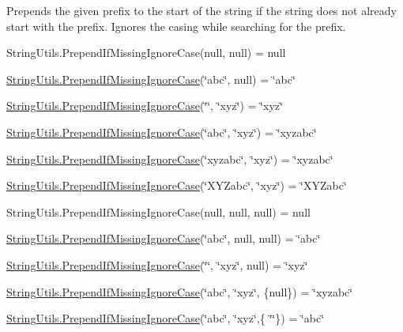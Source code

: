 Prepends the given prefix to the start of the string if the string does not already start with the prefix. Ignores the casing while searching for the prefix. 

String\+Utils.\+Prepend\+If\+Missing\+Ignore\+Case(null, null) = null 

\hyperlink{class_ultimate_1_1_utilities_1_1_string_utils_ab05cdd9dab72f58f40c8930b4f23d3de}{String\+Utils.\+Prepend\+If\+Missing\+Ignore\+Case}(\char`\"{}abc\char`\"{}, null) = \char`\"{}abc\char`\"{} 

\hyperlink{class_ultimate_1_1_utilities_1_1_string_utils_ab05cdd9dab72f58f40c8930b4f23d3de}{String\+Utils.\+Prepend\+If\+Missing\+Ignore\+Case}(\char`\"{}\char`\"{}, \char`\"{}xyz\char`\"{}) = \char`\"{}xyz\char`\"{} 

\hyperlink{class_ultimate_1_1_utilities_1_1_string_utils_ab05cdd9dab72f58f40c8930b4f23d3de}{String\+Utils.\+Prepend\+If\+Missing\+Ignore\+Case}(\char`\"{}abc\char`\"{}, \char`\"{}xyz\char`\"{}) = \char`\"{}xyzabc\char`\"{} 

\hyperlink{class_ultimate_1_1_utilities_1_1_string_utils_ab05cdd9dab72f58f40c8930b4f23d3de}{String\+Utils.\+Prepend\+If\+Missing\+Ignore\+Case}(\char`\"{}xyzabc\char`\"{}, \char`\"{}xyz\char`\"{}) = \char`\"{}xyzabc\char`\"{} 

\hyperlink{class_ultimate_1_1_utilities_1_1_string_utils_ab05cdd9dab72f58f40c8930b4f23d3de}{String\+Utils.\+Prepend\+If\+Missing\+Ignore\+Case}(\char`\"{}\+X\+Y\+Zabc\char`\"{}, \char`\"{}xyz\char`\"{}) = \char`\"{}\+X\+Y\+Zabc\char`\"{} 

String\+Utils.\+Prepend\+If\+Missing\+Ignore\+Case(null, null, null) = null 

\hyperlink{class_ultimate_1_1_utilities_1_1_string_utils_ab05cdd9dab72f58f40c8930b4f23d3de}{String\+Utils.\+Prepend\+If\+Missing\+Ignore\+Case}(\char`\"{}abc\char`\"{}, null, null) = \char`\"{}abc\char`\"{} 

\hyperlink{class_ultimate_1_1_utilities_1_1_string_utils_ab05cdd9dab72f58f40c8930b4f23d3de}{String\+Utils.\+Prepend\+If\+Missing\+Ignore\+Case}(\char`\"{}\char`\"{}, \char`\"{}xyz\char`\"{}, null) = \char`\"{}xyz\char`\"{} 

\hyperlink{class_ultimate_1_1_utilities_1_1_string_utils_ab05cdd9dab72f58f40c8930b4f23d3de}{String\+Utils.\+Prepend\+If\+Missing\+Ignore\+Case}(\char`\"{}abc\char`\"{}, \char`\"{}xyz\char`\"{}, \{null\}) = \char`\"{}xyzabc\char`\"{} 

\hyperlink{class_ultimate_1_1_utilities_1_1_string_utils_ab05cdd9dab72f58f40c8930b4f23d3de}{String\+Utils.\+Prepend\+If\+Missing\+Ignore\+Case}(\char`\"{}abc\char`\"{}, \char`\"{}xyz\char`\"{},\{ \char`\"{}\char`\"{}\}) = \char`\"{}abc\char`\"{} 

